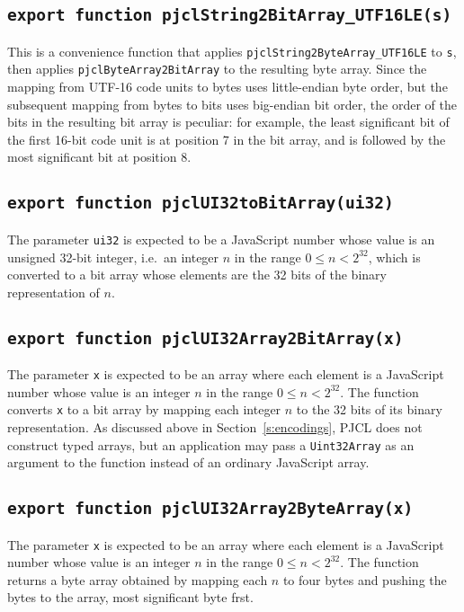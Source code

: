 \documentclass[12pt]{article}
\begin{document}
\subsection{\tt export function pjclString2BitArray\_UTF16LE(s)}

This is a convenience function that applies {\tt pjclString2ByteArray\_UTF16LE} to {\tt s},
then applies {\tt pjclByteArray2BitArray} to the resulting byte array.  Since the mapping
from UTF-16 code units to bytes uses little-endian byte order, but the subsequent
mapping from bytes to bits uses big-endian bit order, the order of the bits in the 
resulting bit array is peculiar: for example, the least significant bit of the first 
16-bit code unit is at position 7 in the bit array, and is followed by the most significant
bit at position 8.

\subsection{\tt export function pjclUI32toBitArray(ui32)}

The parameter {\tt ui32} is expected to be a JavaScript number 
whose value is an unsigned 32-bit integer,
i.e.\ an integer $n$ in the range $0 \leq n < 2^{32}$, which is
converted to a bit array whose elements are the 32 bits of the binary
representation of $n$.

\subsection{\tt export function pjclUI32Array2BitArray(x)}

The parameter {\tt x} is expected to be an array where each element is
a JavaScript number whose value is an integer $n$ in the range $0 \leq
n < 2^{32}$.  The function converts {\tt x} to a bit array by mapping
each integer $n$ to the 32 bits of its binary representation.  As
discussed above in Section~\ref{s:encodings}, PJCL does not construct typed
arrays, but an application may pass a {\tt Uint32Array} as an argument
to the function instead of an ordinary JavaScript array.

\subsection{\tt export function pjclUI32Array2ByteArray(x)}

The parameter {\tt x} is expected to be an array where each element is
a JavaScript number whose value is an integer $n$ in the range $0 \leq
n < 2^{32}$.  The function returns a byte array obtained by mapping
each $n$ to four bytes and pushing
the bytes to the array, most significant byte frst.
\end{document}
